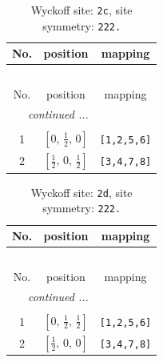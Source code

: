 \documentclass[fleqn,8pt]{jsarticle}
\begin{document}
\renewcommand{\arraystretch}{1.2}
\begin{longtable}{ccc}
\caption{Wyckoff site: {\tt 2c}, site symmetry: {\tt 222.}}
 \\
 \hline \hline
No. & position & mapping \\ \hline \endfirsthead

\multicolumn{2}{l}{\tablename\ \thetable{}} \\
 \hline \hline
No. & position & mapping \\ \hline \endhead

 \hline \hline
\multicolumn{2}{r}{\footnotesize\it continued ...} \\ \endfoot

 \hline \hline
\multicolumn{2}{r}{} \\ \endlastfoot

1 & $\left[ 0,\, \frac{1}{2},\, 0 \right]$ & {\tt [1,2,5,6]} \\ \hline
2 & $\left[ \frac{1}{2},\, 0,\, \frac{1}{2} \right]$ & {\tt [3,4,7,8]} \\
\end{longtable}
\renewcommand{\arraystretch}{1.2}
\begin{longtable}{ccc}
\caption{Wyckoff site: {\tt 2d}, site symmetry: {\tt 222.}}
 \\
 \hline \hline
No. & position & mapping \\ \hline \endfirsthead

\multicolumn{2}{l}{\tablename\ \thetable{}} \\
 \hline \hline
No. & position & mapping \\ \hline \endhead

 \hline \hline
\multicolumn{2}{r}{\footnotesize\it continued ...} \\ \endfoot

 \hline \hline
\multicolumn{2}{r}{} \\ \endlastfoot

1 & $\left[ 0,\, \frac{1}{2},\, \frac{1}{2} \right]$ & {\tt [1,2,5,6]} \\ \hline
2 & $\left[ \frac{1}{2},\, 0,\, 0 \right]$ & {\tt [3,4,7,8]} \\
\end{longtable}
\renewcommand{\arraystretch}{1.2}
\end{document}
